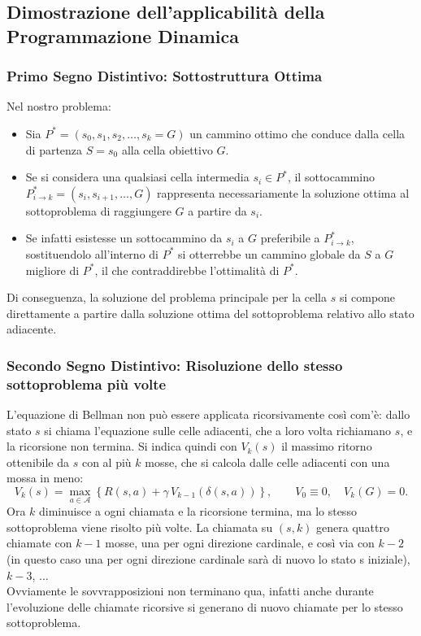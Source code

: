 \clearpage
\subsection{Dimostrazione dell'applicabilità della Programmazione Dinamica}
\subsubsection{Primo Segno Distintivo: Sottostruttura Ottima}

Nel nostro problema:
\begin{itemize}
    \item Sia $P^* = (s_0, s_1, s_2, \dots, s_k = G)$ un cammino ottimo che conduce dalla cella di partenza $S = s_0$ alla cella obiettivo $G$.
    \item Se si considera una qualsiasi cella intermedia $s_i \in P^*$, il sottocammino $P^*_{i \to k} = (s_i, s_{i+1}, \dots, G)$ rappresenta necessariamente la soluzione ottima al sottoproblema di raggiungere $G$ a partire da $s_i$.
    \item Se infatti esistesse un sottocammino da $s_i$ a $G$ preferibile a $P^*_{i \to k}$, sostituendolo all'interno di $P^*$ si otterrebbe un cammino globale da $S$ a $G$ migliore di $P^*$, il che contraddirebbe l'ottimalità di $P^*$.
\end{itemize}

\noindent
Di conseguenza, la soluzione del problema principale per la cella $s$ si compone direttamente a partire dalla soluzione ottima del sottoproblema relativo allo stato adiacente.

\subsubsection{Secondo Segno Distintivo: Risoluzione dello stesso sottoproblema più volte}
L'equazione di Bellman non può essere applicata ricorsivamente così com'è: dallo stato $s$ si chiama l'equazione sulle celle adiacenti, che a loro volta richiamano $s$, e la ricorsione non termina. Si indica quindi con $V_k(s)$ il massimo ritorno ottenibile da $s$ con al più $k$ mosse, che si calcola dalle celle adiacenti con una mossa in meno:
\[
V_k(s) = \max_{a \in \mathcal{A}} \left\{ R(s,a) + \gamma \, V_{k-1}(\delta(s,a)) \right\}, \qquad V_0 \equiv 0, \quad V_k(G) = 0.
\]
Ora $k$ diminuisce a ogni chiamata e la ricorsione termina, ma lo stesso sottoproblema viene risolto più volte. La chiamata su $(s, k)$ genera quattro chiamate con $k-1$ mosse, una per ogni direzione cardinale, e così via con $k-2$ (in questo caso una per ogni direzione cardinale sarà di nuovo lo stato s iniziale), $k-3$, $\dots$\\
Ovviamente le sovvrapposizioni non terminano qua, infatti anche durante l'evoluzione delle chiamate ricorsive si generano di nuovo chiamate per lo stesso sottoproblema.

